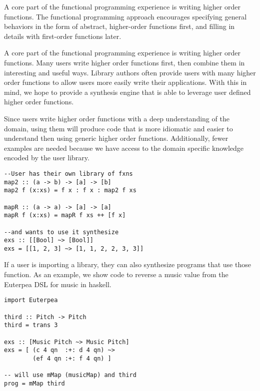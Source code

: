 A core part of the functional programming experience is writing higher order functions. The functional programming approach encourages specifying general behaviors in the form of abstract, higher-order functions first, and filling in details with first-order functions later.

A core part of the functional programming experience is writing higher order functions. Many users write higher order functions first, then combine them in interesting and useful ways. Library authors often provide users with many higher order functions to allow users more easily write their applications. With this in mind, we hope to provide a synthesis engine that is able to leverage user defined higher order functions.

Since users write higher order functions with a deep understanding of the domain, using them will produce code that is more idiomatic and easier to understand then using generic higher order functions. Additionally, fewer examples are needed because we have access to the domain specific knowledge encoded by the user library.

\begin{verbatim}
--User has their own library of fxns
map2 :: (a -> b) -> [a] -> [b]
map2 f (x:xs) = f x : f x : map2 f xs

mapR :: (a -> a) -> [a] -> [a]
mapR f (x:xs) = mapR f xs ++ [f x]

--and wants to use it synthesize
exs :: [[Bool] ~> [Bool]]
exs = [[1, 2, 3] ~> [1, 1, 2, 2, 3, 3]]
\end{verbatim}


If a user is importing a library, they can also synthesize programs that use those function. As an example, we show code to reverse a music value from the Euterpea DSL for music in haskell.

\begin{verbatim}
import Euterpea

third :: Pitch -> Pitch
third = trans 3

exs :: [Music Pitch ~> Music Pitch]
exs = [ (c 4 qn  :+: d 4 qn) ~>
        (ef 4 qn :+: f 4 qn) ]
        
-- will use mMap (musicMap) and third
prog = mMap third
\end{verbatim}

